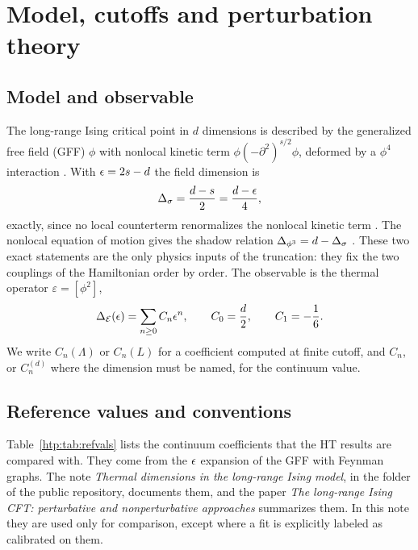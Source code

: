 \section{Model, cutoffs and perturbation theory}\label{htp:sec:method}

\subsection{Model and observable}
The long-range Ising critical point in $d$ dimensions is described by the generalized free field (GFF) $\phi$ with
nonlocal kinetic term $\phi(-\partial^2)^{s/2}\phi$, deformed by a $\phi^4$ interaction
\cite{htp:Fisher:1972zz,htp:Sak:1973oqx,htp:Paulos:2015jfa}. With $\epsilon=2s-d$ the field dimension is
\begin{equation}
 \Delta_\sigma=\frac{d-s}{2}=\frac{d-\epsilon}{4},
\end{equation}
exactly, since no local counterterm renormalizes the nonlocal kinetic term \cite{htp:Paulos:2015jfa}. The nonlocal
equation of motion gives the shadow relation $\Delta_{\phi^3}=d-\Delta_\sigma$ \cite{htp:Paulos:2015jfa}. These two exact statements
are the only physics inputs of the truncation: they fix the two couplings of the Hamiltonian order by order. The
observable is the thermal operator $\varepsilon=[\phi^2]$,
\begin{equation}
 \Delta_{\mathcal E}(\epsilon)=\sum_{n\ge0}C_n\epsilon^n,\qquad C_0=\frac d2,\qquad C_1=-\frac16 .
 \label{htp:eq:Cn}
\end{equation}
We write $C_n(\Lambda)$ or $C_n(L)$ for a coefficient computed at finite cutoff, and $C_n$, or $C_n^{(d)}$ where the
dimension must be named, for the continuum value.

\subsection{Reference values and conventions}\label{htp:sec:refvals}
Table~\ref{htp:tab:refvals} lists the continuum coefficients that the HT results are compared with. They come from the
$\epsilon$ expansion of the GFF with Feynman graphs. The note \emph{Thermal dimensions in the long-range Ising model}, in
the folder  of the public repository, documents them, and the paper \emph{The long-range Ising
CFT: perturbative and nonperturbative approaches} summarizes them. In this note they are used only for
comparison, except where a fit is explicitly labeled as calibrated on them.

